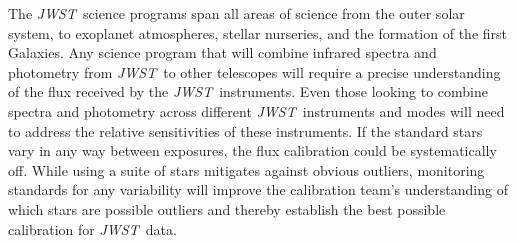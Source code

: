 \documentclass[letterpaper,12pt]{article}
\newcommand{\jwst}{{\it JWST}}
\begin{document}
The \jwst\ science programs span all areas of science from the outer solar system, to exoplanet atmospheres, stellar nurseries, and the formation of the first Galaxies. Any science program that will combine infrared spectra and photometry from \jwst\ to other telescopes will require a precise understanding of the flux received by the \jwst\ instruments.  Even those looking to combine spectra and photometry across different \jwst\ instruments and modes will need to address the relative sensitivities of these instruments. If the standard stars vary in any way between exposures, the flux calibration could be systematically off. While using a suite of stars mitigates against obvious outliers, monitoring standards for any variability will improve the calibration team's understanding of which stars are possible outliers and thereby establish the best possible calibration for \jwst\ data.  


\end{document}
